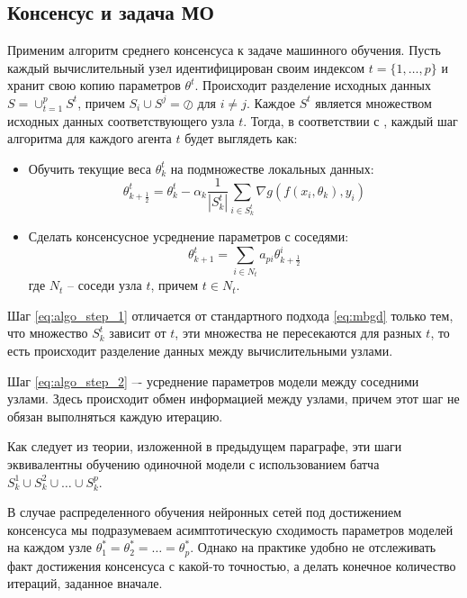 \documentclass[a4paper,article,14pt]{extarticle}
\begin{document}
\subsection{Консенсус и задача МО}
Применим алгоритм среднего консенсуса к задаче машинного обучения. Пусть каждый вычислительный узел идентифицирован своим индексом $t = \{1, \ldots, p \}$ и хранит свою копию параметров $\theta^t$. Происходит разделение исходных данных $S = \cup_{t=1}^p S^t$, причем $S_i \cup S^j = \oslash \text{ для } i \ne j$. Каждое $S^t$ является множеством исходных данных соответствующего узла $t$. Тогда, в соответствии с \cite{decentralized_sgd}, каждый шаг алгоритма для каждого агента $t$ будет выглядеть как:
\begin{itemize}
\item
    Обучить текущие веса $\theta_k^t$ на подмножестве локальных данных:
     \begin{equation} \label{eq:algo_step_1}
    \theta_{k+\frac{1}{2}}^t =
    \theta_k^t - \alpha_k\frac{1}{|S_k^t|}\sum_{i\in S_k^t}\nabla g(f(x_i, \theta_k), y_i)
    \end{equation}

\item
    Сделать консенсусное усреднение параметров с соседями:
     \begin{equation} \label{eq:algo_step_2}
     \theta_{k+1}^t =
     \sum_{i \in N_t}a_{pi}\theta_{k+\frac{1}{2}}^i
     \end{equation}
где $N_t$ -- соседи узла $t$, причем $t \in N_t$.
\end{itemize}

Шаг \ref{eq:algo_step_1} отличается от стандартного подхода \ref{eq:mbgd} только тем, что множество $S_k^t$ зависит от $t$, эти множества не пересекаются для разных $t$, то есть происходит разделение данных между вычислительными узлами.

Шаг \ref{eq:algo_step_2} –- усреднение параметров модели  между соседними узлами. Здесь происходит обмен информацией между узлами, причем этот шаг не обязан выполняться каждую итерацию.

Как следует из теории, изложенной в предыдущем параграфе, эти шаги эквивалентны обучению одиночной модели с использованием батча $S_k^1 \cup S_k^2 \cup \ldots \cup S_k^p$.

В случае распределенного обучения нейронных сетей под достижением консенсуса мы подразумеваем асимптотическую сходимость параметров моделей на каждом узле $\theta_1^*=\theta_2^*=\ldots=\theta_p^*$.
Однако на практике удобно не отслеживать факт достижения консенсуса с какой-то точностью, а делать конечное количество итераций, заданное вначале.
\end{document}
